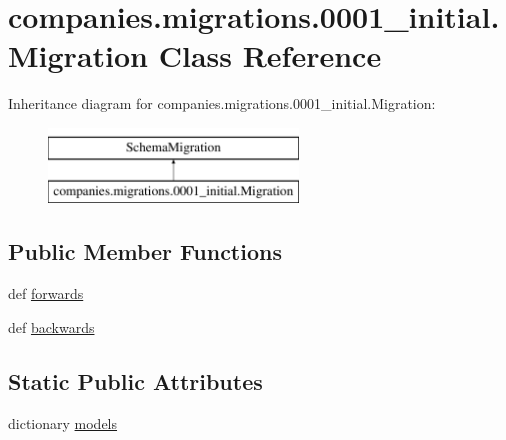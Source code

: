 \hypertarget{classcompanies_1_1migrations_1_10001__initial_1_1_migration}{\section{companies.\-migrations.0001\-\_\-initial.Migration Class Reference}
\label{classcompanies_1_1migrations_1_10001__initial_1_1_migration}
}
Inheritance diagram for companies.\-migrations.0001\-\_\-initial.Migration\-:\begin{figure}[H]
\begin{center}
\leavevmode
\includegraphics[height=2.000000cm]{classcompanies_1_1migrations_1_10001__initial_1_1_migration}
\end{center}
\end{figure}
\subsection*{Public Member Functions}
\begin{DoxyCompactItemize}
\item 
def \hyperlink{classcompanies_1_1migrations_1_10001__initial_1_1_migration_a73832a453bb521043baf92cc0b3d7ccc}{forwards}
\item 
def \hyperlink{classcompanies_1_1migrations_1_10001__initial_1_1_migration_a001630a9ff6f4405785db8b17d3c3a60}{backwards}
\end{DoxyCompactItemize}
\subsection*{Static Public Attributes}
\begin{DoxyCompactItemize}
\item 
dictionary \hyperlink{classcompanies_1_1migrations_1_10001__initial_1_1_migration_a39a65fd1c9475b0ffdbfad4fc4a122f8}{models}
\end{DoxyCompactItemize}


